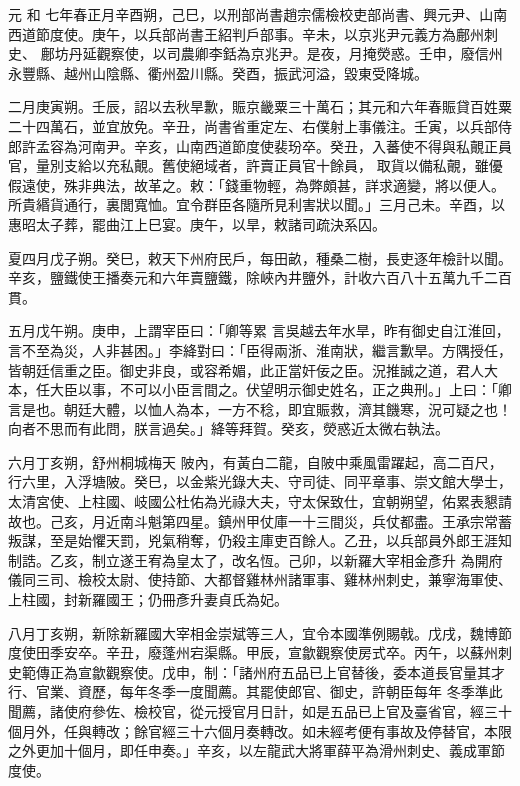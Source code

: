 
\begin{pinyinscope}

 元
 和
 七年春正月辛酉朔，己巳，以刑部尚書趙宗儒檢校吏部尚書、興元尹、山南西道節度使。庚午，以兵部尚書王紹判戶部事。辛未，以京兆尹元義方為鄜州刺史、
 鄜坊丹延觀察使，以司農卿李銛為京兆尹。是夜，月掩熒惑。壬申，廢信州永豐縣、越州山陰縣、衢州盈川縣。癸酉，振武河溢，毀東受降城。



 二月庚寅朔。壬辰，詔以去秋旱歉，賑京畿粟三十萬石；其元和六年春賑貸百姓粟二十四萬石，並宜放免。辛丑，尚書省重定左、右僕射上事儀注。壬寅，以兵部侍郎許孟容為河南尹。辛亥，山南西道節度使裴玢卒。癸丑，入蕃使不得與私覿正員官，量別支給以充私覿。舊使絕域者，許賣正員官十餘員，
 取貨以備私覿，雖優假遠使，殊非典法，故革之。敕：「錢重物輕，為弊頗甚，詳求適變，將以便人。所貴緡貨通行，裏閭寬恤。宜令群臣各隨所見利害狀以聞。」三月己未。辛酉，以惠昭太子葬，罷曲江上巳宴。庚午，以旱，敕諸司疏決系囚。



 夏四月戊子朔。癸巳，敕天下州府民戶，每田畝，種桑二樹，長吏逐年檢計以聞。辛亥，鹽鐵使王播奏元和六年賣鹽鐵，除峽內井鹽外，計收六百八十五萬九千二百貫。



 五月戊午朔。庚申，上謂宰臣曰：「卿等累
 言吳越去年水旱，昨有御史自江淮回，言不至為災，人非甚困。」李絳對曰：「臣得兩浙、淮南狀，繼言歉旱。方隅授任，皆朝廷信重之臣。御史非良，或容希媚，此正當奸佞之臣。況推誠之道，君人大本，任大臣以事，不可以小臣言間之。伏望明示御史姓名，正之典刑。」上曰：「卿言是也。朝廷大體，以恤人為本，一方不稔，即宜賑救，濟其饑寒，況可疑之也！向者不思而有此問，朕言過矣。」絳等拜賀。癸亥，熒惑近太微右執法。



 六月丁亥朔，舒州桐城梅天
 陂內，有黃白二龍，自陂中乘風雷躍起，高二百尺，行六里，入浮塘陂。癸巳，以金紫光錄大夫、守司徒、同平章事、崇文館大學士，太清宮使、上柱國、岐國公杜佑為光祿大夫，守太保致仕，宜朝朔望，佑累表懇請故也。己亥，月近南斗魁第四星。鎮州甲仗庫一十三間災，兵仗都盡。王承宗常蓄叛謀，至是始懼天罰，兇氣稍奪，仍殺主庫吏百餘人。乙丑，以兵部員外郎王涯知制誥。乙亥，制立遂王宥為皇太了，改名恆。己卯，以新羅大宰相金彥升
 為開府儀同三司、檢校太尉、使持節、大都督雞林州諸軍事、雞林州刺史，兼寧海軍使、上柱國，封新羅國王；仍冊彥升妻貞氏為妃。



 八月丁亥朔，新除新羅國大宰相金崇斌等三人，宜令本國準例賜戟。戊戌，魏博節度使田季安卒。辛丑，廢蓬州宕渠縣。甲辰，宣歙觀察使房式卒。丙午，以蘇州刺史範傳正為宣歙觀察使。戊申，制：「諸州府五品已上官替後，委本道長官量其才行、官業、資歷，每年冬季一度聞薦。其罷使郎官、御史，許朝臣每年
 冬季準此聞薦，諸使府參佐、檢校官，從元授官月日計，如是五品已上官及臺省官，經三十個月外，任與轉改；餘官經三十六個月奏轉改。如未經考便有事故及停替官，本限之外更加十個月，即任申奏。」辛亥，以左龍武大將軍薛平為滑州刺史、義成軍節度使。




\end{pinyinscope}
